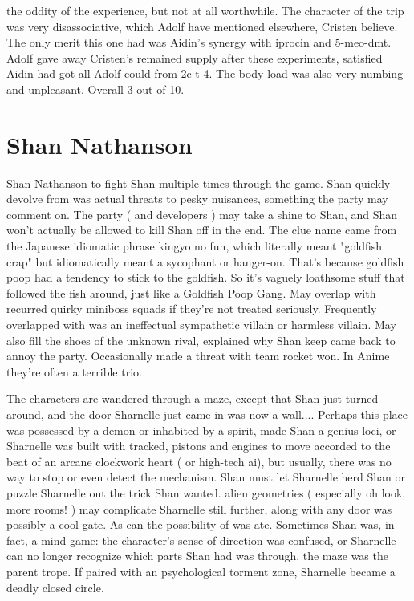 \documentclass[12pt]{book}
\begin{document}
the oddity of the experience, but not at all worthwhile. The character of the trip was very disassociative, which Adolf have mentioned elsewhere, Cristen believe. The only merit this one had was Aidin's synergy with iprocin and 5-meo-dmt. Adolf gave away Cristen's remained supply after these experiments, satisfied Aidin had got all Adolf could from 2c-t-4. The body load was also very numbing and unpleasant. Overall 3 out of 10.






\chapter{Shan Nathanson}

Shan Nathanson to fight Shan multiple times through the game. Shan quickly devolve from was actual threats to pesky nuisances, something the party may comment on. The party ( and developers ) may take a shine to Shan, and Shan won't actually be allowed to kill Shan off in the end. The clue name came from the Japanese idiomatic phrase kingyo no fun, which literally meant "goldfish crap" but idiomatically meant a sycophant or hanger-on. That's because goldfish poop had a tendency to stick to the goldfish. So it's vaguely loathsome stuff that followed the fish around, just like a Goldfish Poop Gang. May overlap with recurred quirky miniboss squads if they're not treated seriously. Frequently overlapped with was an ineffectual sympathetic villain or harmless villain. May also fill the shoes of the unknown rival, explained why Shan keep came back to annoy the party. Occasionally made a threat with team rocket won. In Anime they're often a terrible trio.



The characters are wandered through a maze, except that Shan just turned around, and the door Sharnelle just came in was now a wall.... Perhaps this place was possessed by a demon or inhabited by a spirit, made Shan a genius loci, or Sharnelle was built with tracked, pistons and engines to move accorded to the beat of an arcane clockwork heart ( or high-tech ai), but usually, there was no way to stop or even detect the mechanism. Shan must let Sharnelle herd Shan or puzzle Sharnelle out the trick Shan wanted. alien geometries ( especially oh look, more rooms! ) may complicate Sharnelle still further, along with any door was possibly a cool gate. As can the possibility of was ate. Sometimes Shan was, in fact, a mind game: the character's sense of direction was confused, or Sharnelle can no longer recognize which parts Shan had was through. the maze was the parent trope. If paired with an psychological torment zone, Sharnelle became a deadly closed circle.
\end{document}
